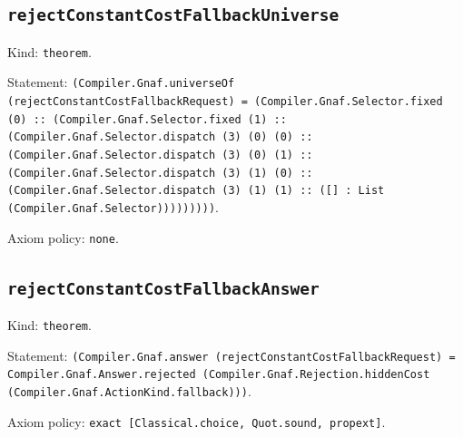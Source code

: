 \documentclass[11pt]{article}
\begin{document}
\subsection*{\texttt{rejectConstantCostFallbackUniverse}}
\noindent Kind: \texttt{theorem}.\par
\noindent Statement: \texttt{(Compiler.Gnaf.universeOf (rejectConstantCostFallbackRequest) = (Compiler.Gnaf.Selector.fixed (0) :: (Compiler.Gnaf.Selector.fixed (1) :: (Compiler.Gnaf.Selector.dispatch (3) (0) (0) :: (Compiler.Gnaf.Selector.dispatch (3) (0) (1) :: (Compiler.Gnaf.Selector.dispatch (3) (1) (0) :: (Compiler.Gnaf.Selector.dispatch (3) (1) (1) :: ([] : List (Compiler.Gnaf.Selector)))))))))}.\par
\noindent Axiom policy: \texttt{none}.\par
\subsection*{\texttt{rejectConstantCostFallbackAnswer}}
\noindent Kind: \texttt{theorem}.\par
\noindent Statement: \texttt{(Compiler.Gnaf.answer (rejectConstantCostFallbackRequest) = Compiler.Gnaf.Answer.rejected (Compiler.Gnaf.Rejection.hiddenCost (Compiler.Gnaf.ActionKind.fallback)))}.\par
\noindent Axiom policy: \texttt{exact [Classical.choice, Quot.sound, propext]}.\par
\end{document}
